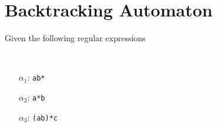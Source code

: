 \documentclass[11pt,a4paper]{article}
\begin{document}
\newpage
\section{Backtracking Automaton}
Given the following regular expressions

\begin{multicols}{5}
	
	{\ }\vfill\columnbreak %

	\centering
	\begin{itemize}
		\item[$\alpha_1$:] \verb/ab*/
	\end{itemize}

	\vfill
	\columnbreak

	\centering
	\begin{itemize}
		\item[$\alpha_2$:] \verb/a*b/
	\end{itemize}

	\vfill
	\columnbreak

	\centering
	\begin{itemize}
		\item[$\alpha_3$:] \verb/(ab)*c/
	\end{itemize}

	\vfill\columnbreak{\ } %

\end{multicols}
\end{document}
